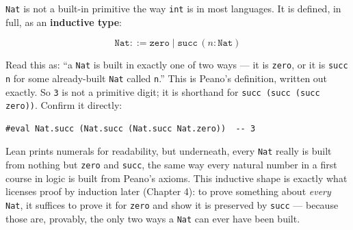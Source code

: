 \texttt{Nat} is not a built-in primitive the way \texttt{int} is in most languages. It is defined, in full, as an \textbf{inductive type}:

\[
\mathtt{Nat} ::= \mathtt{zero} \mid \mathtt{succ}\,(n : \mathtt{Nat})
\]

Read this as: ``a \texttt{Nat} is built in exactly one of two ways --- it is \texttt{zero}, or it is \texttt{succ n} for some already-built \texttt{Nat} called \texttt{n}.'' This is Peano's definition, written out exactly. So \texttt{3} is not a primitive digit; it is shorthand for \texttt{succ (succ (succ zero))}. Confirm it directly:

\begin{lstlisting}
#eval Nat.succ (Nat.succ (Nat.succ Nat.zero))  -- 3
\end{lstlisting}

Lean prints numerals for readability, but underneath, every \texttt{Nat} really is built from nothing but \texttt{zero} and \texttt{succ}, the same way every natural number in a first course in logic is built from Peano's axioms. This inductive shape is exactly what licenses proof by induction later (Chapter 4): to prove something about \emph{every} \texttt{Nat}, it suffices to prove it for \texttt{zero} and show it is preserved by \texttt{succ} --- because those are, provably, the only two ways a \texttt{Nat} can ever have been built.

